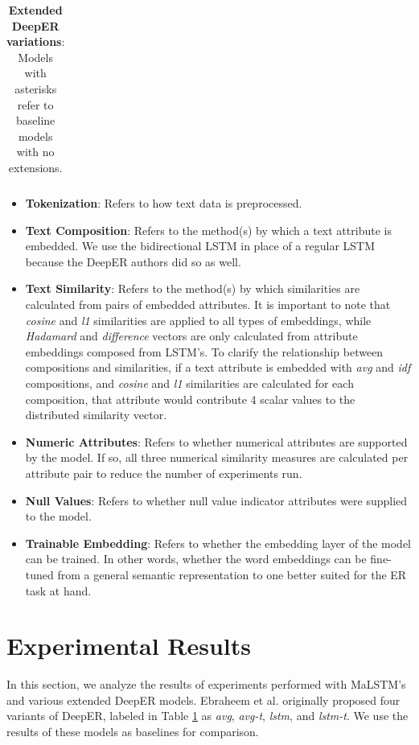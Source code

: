\documentclass{proc}
\begin{document}
\begin{table}[t]
\begin{center}
\begin{tabular}{ |m{2cm}|m{1.5cm}|m{2.5cm}|m{3.5cm}|m{1.5cm}|m{1.5cm}|m{2cm}|}
		\end{tabular}
		\caption{\textbf{Extended DeepER variations}: Models with asterisks refer to baseline models with no extensions.}
		\label{table:deep-er-variations}
	\end{center}
\end{table}

\begin{itemize}
\item{\textbf{Tokenization}}: Refers to how text data is preprocessed.
\item{\textbf{Text Composition}}: Refers to the method(s) by which a text attribute is embedded. We use the bidirectional LSTM in place of a regular LSTM because the DeepER authors did so as well.
\item{\textbf{Text Similarity}}: Refers to the method(s) by which similarities are calculated from pairs of embedded attributes. It is important to note that \textit{cosine} and \textit{l1} similarities are applied to all types of embeddings, while \textit{Hadamard} and \textit{difference} vectors are only calculated from attribute embeddings composed from LSTM's. To clarify the relationship between compositions and similarities, if a text attribute is embedded with \textit{avg} and \textit{idf} compositions, and \textit{cosine} and \textit{l1} similarities are calculated for each composition, that attribute would contribute 4 scalar values to the distributed similarity vector.
\item{\textbf{Numeric Attributes}}: Refers to whether numerical attributes are supported by the model. If so, all three numerical similarity measures are calculated per attribute pair to reduce the number of experiments run.
\item{\textbf{Null Values}}: Refers to whether null value indicator attributes were supplied to the model.
\item{\textbf{Trainable Embedding}}: Refers to whether the embedding layer of the model can be trained. In other words, whether the word embeddings can be fine-tuned from a general semantic representation to one better suited for the ER task at hand.
\end{itemize}

\section{Experimental Results}

In this section, we analyze the results of experiments performed with MaLSTM's and various extended DeepER models. Ebraheem et al. \cite{ebraheem} originally proposed four variants of DeepER, labeled in Table \ref{table:deep-er-variations} as \textit{avg}, \textit{avg-t}, \textit{lstm}, and \textit{lstm-t}. We use the results of these models as baselines for comparison.
\end{document}
